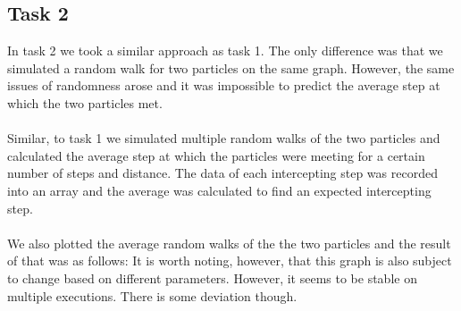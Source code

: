 \documentclass{article}
\begin{document}
\subsection{Task 2}
In task 2 we took a similar approach as task 1. The only difference was that we simulated a random walk 
for two particles on the same graph. However, the same issues of randomness arose and it was impossible to
predict the average step at which the two particles met. 
\\\\
Similar, to task 1 we simulated multiple random walks of the two particles and calculated the average step 
at which the particles were meeting for a certain number of steps and distance. The data of each intercepting 
step was recorded into an array and the average was calculated to find an expected intercepting step.
\\\\
We also plotted the average random walks of the the two particles and the result of that was as follows:
It is worth noting, however, that this graph is also subject to change based on different parameters. However, 
it seems to be stable on multiple executions. There is some deviation though. 
\end{document}

